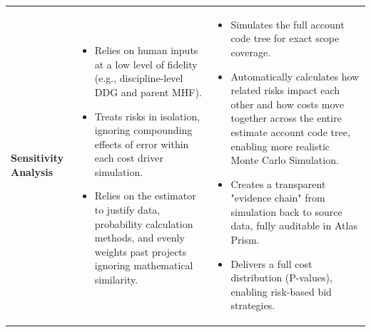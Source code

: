 \documentclass[12pt, a4paper]{article} %
\begin{document}
\begin{table}[h!]
\begin{tabularx}{\textwidth}{@{}
  >{\raggedright\arraybackslash\relax}p{2.5cm}
  X 
  X
@{}}
\textbf{Sensitivity Analysis} &
\vspace*{-\topsep}\vspace{\parskip}
\begin{itemize}[leftmargin=*, nosep]
  \item Relies on human inputs at a low level of fidelity (e.g., discipline-level DDG and parent MHF).
  \item Treats risks in isolation, ignoring compounding effects of error within each cost driver simulation.
  \item Relies on the estimator to justify data, probability calculation methods, and evenly weights past projects ignoring mathematical similarity.
\end{itemize} 
\vspace*{-\topsep}\vspace{\parskip}&
\vspace*{-\topsep}\vspace{\parskip}
\begin{itemize}[leftmargin=*, nosep]
  \item Simulates the full account code tree for exact scope coverage.
  \item Automatically calculates how related risks impact each other and how costs move together across the entire estimate account code tree, enabling more realistic Monte Carlo Simulation.
  \item Creates a transparent "evidence chain" from simulation back to source data, fully auditable in Atlas Prism.
  \item Delivers a full cost distribution (P-values), enabling risk-based bid strategies.
\end{itemize} 
\vspace*{-\topsep}\vspace{\parskip}\\

\end{tabularx}
\end{table}

\thispagestyle{empty}

\newpage
\end{document}
